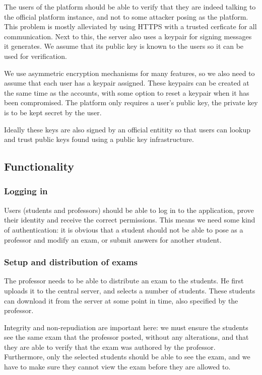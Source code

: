 \documentclass[12pt]{article}
\begin{document}
The users of the platform should be able to verify that they are indeed talking
to the official platform instance, and not to some attacker posing as the
platform. This problem is mostly alleviated by using HTTPS with a trusted
cerficate for all communication. Next to this, the server also uses a keypair
for signing messages it generates. We assume that its public key is known to the
users so it can be used for verification.

We use asymmetric encryption mechanisms for many features, so we also need to
assume that each user has a keypair assigned. These keypairs can be created at
the same time as the accounts, with some option to reset a keypair when it has
been compromised. The platform only requires a user's public key, the private
key is to be kept secret by the user.

Ideally these keys are also signed by an official entitity so that users can
lookup and trust public keys found using a public key infrastructure.

\subsection{Functionality}
\label{subsec:req-functionality}

\subsubsection{Logging in}
\label{subsubsec:req-func-auth}

Users (students and professors) should be able to log in to the application,
prove their identity and receive the correct permissions. This means we need
some kind of authentication: it is obvious that a student should not be able to
pose as a professor and modify an exam, or submit answers for another student.

\subsubsection{Setup and distribution of exams}
\label{subsubsec:req-func-exams}

The professor needs to be able to distribute an exam to the students. He first
uploads it to the central server, and selects a number of students. These
students can download it from the server at some point in time, also specified
by the professor.

Integrity and non-repudiation are important here: we must ensure the students
see the same exam that the professor posted, without any alterations, and that
they are able to verify that the exam was authored by the professor.
Furthermore, only the selected students should be able to see the exam, and we
have to make sure they cannot view the exam before they are allowed to.
\end{document}

